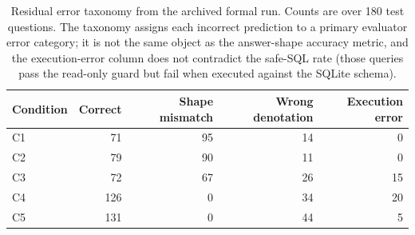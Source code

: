 \documentclass[11pt]{article}
\begin{document}
\begin{table}[htbp]
\caption{Residual error taxonomy from the archived formal run. Counts are over 180 test questions. The taxonomy assigns each incorrect prediction to a primary evaluator error category; it is not the same object as the answer-shape accuracy metric, and the execution-error column does not contradict the safe-SQL rate (those queries pass the read-only guard but fail when executed against the SQLite schema).}
\label{tab:sup-error-taxonomy}
\centering
\small
\begin{tabular*}{\textwidth}{@{\extracolsep{\fill}}lrrrr}
\toprule
\textbf{Condition} & \textbf{Correct} & \textbf{Shape mismatch} & \textbf{Wrong denotation} & \textbf{Execution error} \\
\midrule
C1 & 71 & 95 & 14 & 0 \\
C2 & 79 & 90 & 11 & 0 \\
C3 & 72 & 67 & 26 & 15 \\
C4 & 126 & 0 & 34 & 20 \\
C5 & 131 & 0 & 44 & 5 \\
\bottomrule
\end{tabular*}
\end{table}
\end{document}
